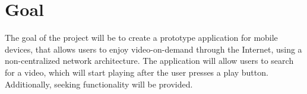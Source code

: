 \section{Goal}
The goal of the project will be to create a prototype application for mobile devices, that allows users to enjoy video-on-demand through the Internet, using a non-centralized network architecture. The application will allow users to search for a video, which will start playing after the user presses a play button. Additionally, seeking functionality will be provided.
